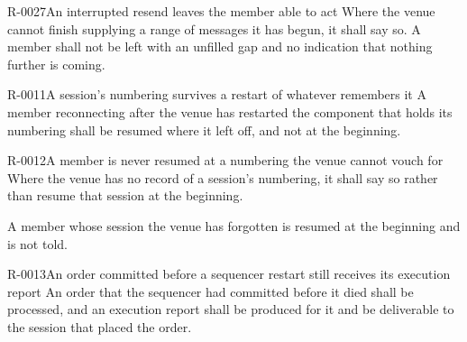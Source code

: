 \begin{requirement}{R-0027}{An interrupted resend leaves the member able to act}
  Where the venue cannot finish supplying a range of messages it has begun, it
  shall say so. A member shall not be left with an unfilled gap and no
  indication that nothing further is coming.
\end{requirement}

\begin{requirement}{R-0011}{A session's numbering survives a restart of whatever remembers it}
  A member reconnecting after the venue has restarted the component that holds
  its numbering shall be resumed where it left off, and not at the beginning.
\end{requirement}

\begin{requirement}{R-0012}{A member is never resumed at a numbering the venue cannot vouch for}
  Where the venue has no record of a session's numbering, it shall say so rather
  than resume that session at the beginning.
\end{requirement}

\begin{gap}{}
  A member whose session the venue has forgotten is resumed at the beginning and
  is not told.
\end{gap}

\begin{requirement}{R-0013}{An order committed before a sequencer restart still receives its execution report}
  An order that the sequencer had committed before it died shall be processed,
  and an execution report shall be produced for it and be deliverable to the
  session that placed the order.
\end{requirement}

